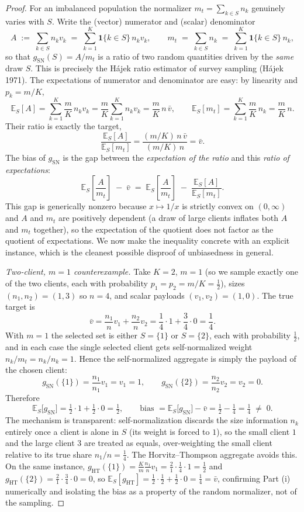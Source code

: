 \documentclass[11pt]{article}
\theoremstyle{definition}
\theoremstyle{remark}
\begin{document}
\begin{proof}
For an imbalanced population the normalizer $m_t=\sum_{k\in S}n_k$ genuinely varies with $S$. Write the (vector) numerator and (scalar) denominator
\[
A \;:=\; \sum_{k\in S}n_k v_k \;=\; \sum_{k=1}^{K}\mathbf 1\{k\in S\}\,n_k v_k ,
\qquad
m_t \;=\; \sum_{k\in S}n_k \;=\; \sum_{k=1}^{K}\mathbf 1\{k\in S\}\,n_k ,
\]
so that $g_{\mathrm{SN}}(S)=A/m_t$ is a ratio of two random quantities driven by the \emph{same} draw $S$. This is precisely the H\'ajek ratio estimator of survey sampling (H\'ajek 1971). The expectations of numerator and denominator are easy: by linearity and $p_k=m/K$,
\[
\mathbb{E}_S[A]=\sum_{k=1}^{K}\frac{m}{K}\,n_k v_k=\frac{m}{K}\sum_{k=1}^{K}n_k v_k=\frac{m}{K}\,n\,\bar v,
\qquad
\mathbb{E}_S[m_t]=\sum_{k=1}^{K}\frac{m}{K}\,n_k=\frac{m}{K}\,n .
\]
Their ratio is exactly the target,
\[
\frac{\mathbb{E}_S[A]}{\mathbb{E}_S[m_t]}=\frac{(m/K)\,n\,\bar v}{(m/K)\,n}=\bar v .
\]
The bias of $g_{\mathrm{SN}}$ is the gap between the \emph{expectation of the ratio} and this \emph{ratio of expectations}:
\[
\mathbb{E}_S\!\left[\frac{A}{m_t}\right]\;-\;\bar v
\;=\;\mathbb{E}_S\!\left[\frac{A}{m_t}\right]\;-\;\frac{\mathbb{E}_S[A]}{\mathbb{E}_S[m_t]} .
\]
This gap is generically nonzero because $x\mapsto 1/x$ is strictly convex on $(0,\infty)$ and $A$ and $m_t$ are positively dependent (a draw of large clients inflates both $A$ and $m_t$ together), so the expectation of the quotient does not factor as the quotient of expectations. We now make the inequality concrete with an explicit instance, which is the cleanest possible disproof of unbiasedness in general.

\smallskip
\noindent\emph{Two-client, $m=1$ counterexample.} Take $K=2$, $m=1$ (so we sample exactly one of the two clients, each with probability $p_1=p_2=m/K=\tfrac12$), sizes $(n_1,n_2)=(1,3)$ so $n=4$, and scalar payloads $(v_1,v_2)=(1,0)$. The true target is
\[
\bar v=\frac{n_1}{n}v_1+\frac{n_2}{n}v_2=\frac{1}{4}\cdot 1+\frac{3}{4}\cdot 0=\frac14 .
\]
With $m=1$ the selected set is either $S=\{1\}$ or $S=\{2\}$, each with probability $\tfrac12$, and in each case the single selected client gets self-normalized weight $n_k/m_t=n_k/n_k=1$. Hence the self-normalized aggregate is simply the payload of the chosen client:
\[
g_{\mathrm{SN}}(\{1\})=\frac{n_1}{n_1}v_1=v_1=1,
\qquad
g_{\mathrm{SN}}(\{2\})=\frac{n_2}{n_2}v_2=v_2=0 .
\]
Therefore
\[
\mathbb{E}_S\big[g_{\mathrm{SN}}\big]=\tfrac12\cdot 1+\tfrac12\cdot 0=\tfrac12,
\qquad
\text{bias }=\mathbb{E}_S\big[g_{\mathrm{SN}}\big]-\bar v=\tfrac12-\tfrac14=\tfrac14\;\ne\;0 .
\]
The mechanism is transparent: self-normalization discards the size information $n_k$ entirely once a client is alone in $S$ (its weight is forced to $1$), so the small client $1$ and the large client $3$ are treated as equals, over-weighting the small client relative to its true share $n_1/n=\tfrac14$. The Horvitz--Thompson aggregate avoids this. On the same instance, $g_{\mathrm{HT}}(\{1\})=\frac{K}{m}\frac{n_1}{n}v_1=\frac{2}{1}\cdot\frac{1}{4}\cdot 1=\tfrac12$ and $g_{\mathrm{HT}}(\{2\})=\frac{2}{1}\cdot\frac{3}{4}\cdot 0=0$, so $\mathbb{E}_S[g_{\mathrm{HT}}]=\tfrac12\cdot\tfrac12+\tfrac12\cdot 0=\tfrac14=\bar v$, confirming Part (i) numerically and isolating the bias as a property of the random normalizer, not of the sampling.


\end{proof}
\end{document}
